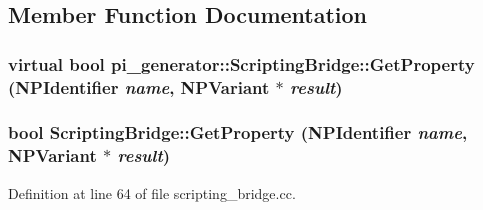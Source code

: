 \subsection{Member Function Documentation}
\hypertarget{classpi__generator_1_1_scripting_bridge_a6c4717a5a7d7c24c697d129904d0e0bf}{
\subsubsection[{GetProperty}]{\setlength{\rightskip}{0pt plus 5cm}virtual bool pi\_\-generator::ScriptingBridge::GetProperty (NPIdentifier {\em name}, \/  NPVariant $\ast$ {\em result})}}
\label{classpi__generator_1_1_scripting_bridge_a6c4717a5a7d7c24c697d129904d0e0bf}
\hypertarget{classpi__generator_1_1_scripting_bridge_afef889fc2ff5ccabefb713cf7ad5e056}{
\subsubsection[{GetProperty}]{\setlength{\rightskip}{0pt plus 5cm}bool ScriptingBridge::GetProperty (NPIdentifier {\em name}, \/  NPVariant $\ast$ {\em result})}}
\label{classpi__generator_1_1_scripting_bridge_afef889fc2ff5ccabefb713cf7ad5e056}


Definition at line 64 of file scripting\_\-bridge.cc.

